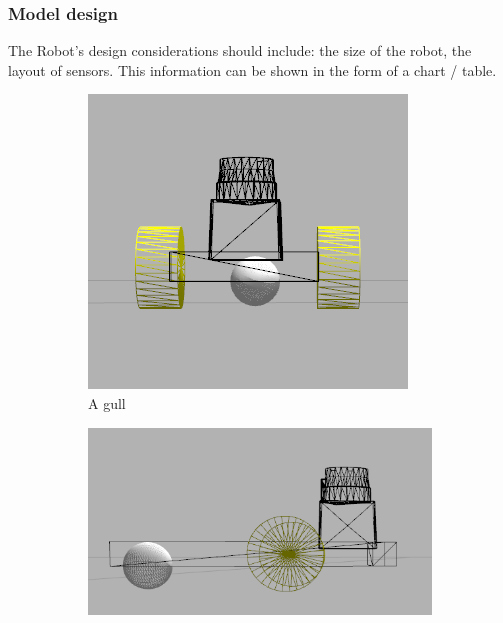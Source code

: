 \documentclass[10pt,journal,compsoc]{IEEEtran}
\begin{document}
\subsubsection{Model design}
The Robot's design considerations should include: the size of the robot, the layout of sensors. This information can be shown in the form of a chart / table.

\begin{figure}
    \centering
    \begin{subfigure}[b]{0.3\textwidth}
        \includegraphics[width=\textwidth]{robokoko-design-1}
        \caption{A gull}
        \label{fig:gull}
    \end{subfigure}
    \begin{subfigure}[b]{0.3\textwidth}
        \includegraphics[width=\textwidth]{robokoko-design-2}

\end{subfigure}
\end{figure}
\end{document}
